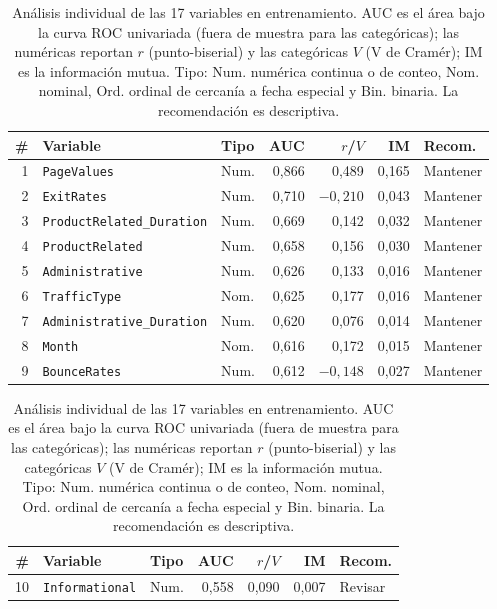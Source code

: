 \documentclass[journal]{IEEEtran}
\begin{document}
\begin{table}[t]
\centering
\caption{Análisis individual de las 17 variables en entrenamiento. AUC es el área bajo la
curva ROC univariada (fuera de muestra para las categóricas); las numéricas reportan $r$
(punto-biserial) y las categóricas $V$ (V de Cramér); IM es la información mutua. Tipo:
Num. numérica continua o de conteo, Nom. nominal, Ord. ordinal de cercanía a fecha
especial y Bin. binaria. La recomendación es descriptiva.}
\label{tab:variables-individuales}
\scriptsize
\renewcommand{\arraystretch}{1.02}
\setlength{\tabcolsep}{2.2pt}
\begin{minipage}[t]{0.49\textwidth}
\centering
\begin{tabular}{@{}r p{2.15cm} p{1.05cm} r r r l@{}}
\toprule
\textbf{\#} & \textbf{Variable} & \textbf{Tipo} & \textbf{AUC} & \textbf{$r$/$V$} & \textbf{IM} & \textbf{Recom.} \\
\midrule
1 & \texttt{PageValues} & Num. & 0{,}866 & 0{,}489 & 0{,}165 & Mantener \\
2 & \texttt{ExitRates} & Num. & 0{,}710 & $-0{,}210$ & 0{,}043 & Mantener \\
3 & \texttt{ProductRelated\_}\allowbreak\texttt{Duration} & Num. & 0{,}669 & 0{,}142 & 0{,}032 & Mantener \\
4 & \texttt{ProductRelated} & Num. & 0{,}658 & 0{,}156 & 0{,}030 & Mantener \\
5 & \texttt{Administrative} & Num. & 0{,}626 & 0{,}133 & 0{,}016 & Mantener \\
6 & \texttt{TrafficType} & Nom. & 0{,}625 & 0{,}177 & 0{,}016 & Mantener \\
7 & \texttt{Administrative\_}\allowbreak\texttt{Duration} & Num. & 0{,}620 & 0{,}076 & 0{,}014 & Mantener \\
8 & \texttt{Month} & Nom. & 0{,}616 & 0{,}172 & 0{,}015 & Mantener \\
9 & \texttt{BounceRates} & Num. & 0{,}612 & $-0{,}148$ & 0{,}027 & Mantener \\
\bottomrule
\end{tabular}
\end{minipage}\hfill
\begin{minipage}[t]{0.49\textwidth}
\centering
\begin{tabular}{@{}r p{2.15cm} p{1.05cm} r r r l@{}}
\toprule
\textbf{\#} & \textbf{Variable} & \textbf{Tipo} & \textbf{AUC} & \textbf{$r$/$V$} & \textbf{IM} & \textbf{Recom.} \\
\midrule
10 & \texttt{Informational} & Num. & 0{,}558 & 0{,}090 & 0{,}007 & Revisar \\

\end{tabular}
\end{minipage}
\end{table}
\end{document}
